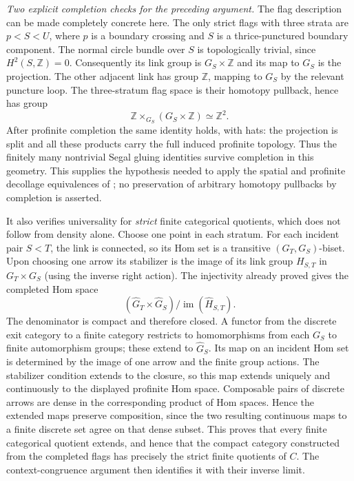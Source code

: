 \emph{Two explicit completion checks for the preceding argument.}
The flag description can be made completely concrete here. The only
strict flags with three strata are
$p<S<U$, where $p$ is a boundary crossing and $S$ is a
thrice-punctured boundary component. The normal circle bundle over
$S$ is topologically trivial, since $H^2(S,\mathbb Z)=0$.
Consequently its link group is $G_S\times\mathbb Z$ and its map to
$G_S$ is the projection. The other adjacent link has group
$\mathbb Z$, mapping to $G_S$ by the relevant puncture loop. The
three-stratum flag space is their homotopy pullback, hence has group
\[
 \mathbb Z\mathbin{\times}_{G_S}(G_S\times\mathbb Z)
                         \simeq\mathbb Z^2.
\]
After profinite completion the same identity holds, with hats: the
projection is split and all these products carry the full induced
profinite topology. Thus the finitely many nontrivial Segal gluing
identities survive completion in this geometry. This supplies the
hypothesis needed to apply the spatial and profinite decollage
equivalences of \cite[Theorem~2.7.4 and equivalence~(2.8.9)]{BGH2020};
no preservation of arbitrary homotopy pullbacks by completion is
asserted.

It also verifies universality for \emph{strict} finite categorical
quotients, which does not follow from density alone. Choose one point
in each stratum. For each incident pair $S<T$, the link is connected,
so its Hom set is a transitive $(G_T,G_S)$-biset. Upon choosing one
arrow its stabilizer is the image of its link group $H_{S,T}$ in
$G_T\times G_S$ (using the inverse right action). The injectivity
already proved gives the completed Hom space
\[
  (\widehat G_T\times\widehat G_S)
           /\operatorname{im}(\widehat H_{S,T}).
\]
The denominator is compact and therefore closed. A functor from the
discrete exit category to a finite category restricts to homomorphisms
from each $G_S$ to finite automorphism groups; these extend to
$\widehat G_S$. Its map on an incident Hom set is determined by the
image of one arrow and the finite group actions. The stabilizer
condition extends to the closure, so this map extends uniquely and
continuously to the displayed profinite Hom space. Composable pairs
of discrete arrows are dense in the corresponding product of Hom
spaces. Hence the extended maps preserve composition, since the
two resulting continuous maps to a finite discrete set agree on that
dense subset. This proves that every finite categorical quotient
extends, and hence that the compact category constructed from the
completed flags has precisely the strict finite quotients of $C$.
The context-congruence argument then identifies it with their inverse
limit.

